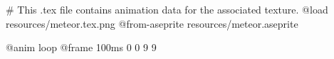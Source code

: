 # This .tex file contains animation data for the associated texture.
@load resources/meteor.tex.png
@from-aseprite resources/meteor.aseprite

@anim loop
	@frame 100ms 0 0 9 9
